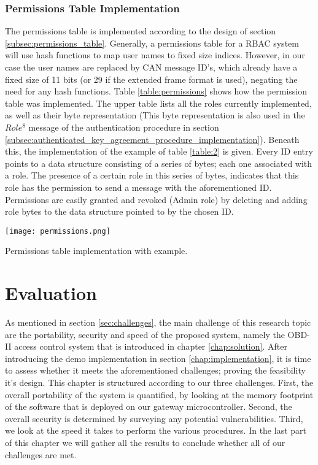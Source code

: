 \subsubsection{Permissions Table Implementation}
\label{subsec:permissions_table_implementation}

The permissions table is implemented according to the design of section \ref{subsec:permissions_table}. Generally, a permissions table for a RBAC system will use hash functions to map user names to fixed size indices. However, in our case the user names are replaced by CAN message ID's, which already have a fixed size of 11 bits (or 29 if the extended frame format is used), negating the need for any hash functions. Table \ref{table:permissions} shows how the permission table was implemented. The upper table lists all the roles currently implemented, as well as their byte representation (This byte representation is also used in the $Role^{8}$ message of the authentication procedure in section \ref{subsec:authenticated_key_agreement_procedure_implementation}). Beneath this, the implementation of the example of table \ref{table:2} is given. Every ID entry points to a data structure consisting of a series of bytes; each one associated with a role. The presence of a certain role in this series of bytes, indicates that this role has the permission to send a message with the aforementioned ID. Permissions are easily granted and revoked (Admin role) by deleting and adding role bytes to the data structure pointed to by the chosen ID. 

\begin{table}[h]
	\label{table:permissions}
	\centering
	\texttt{[image: permissions.png]}
	\caption{Permissions table implementation with example.}
\end{table}


\section{Evaluation}
\label{chap:evaluation}

As mentioned in section \ref{sec:challenges}, the main challenge of this research topic are the portability, security and speed of the proposed system, namely the OBD-II access control system that is introduced in chapter \ref{chap:solution}. After introducing the demo implementation in section \ref{chap:implementation}, it is time to assess whether it meets the aforementioned challenges; proving the feasibility it's design. This chapter is structured according to our three challenges. First, the overall portability of the system is quantified, by looking at the memory footprint of the software that is deployed on our gateway microcontroller. Second, the overall security is determined by surveying any potential vulnerabilities. Third, we look at the speed it takes to perform the various procedures. In the last part of this chapter we will gather all the results to conclude whether all of our challenges are met.   


